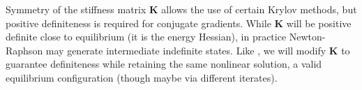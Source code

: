 Symmetry of the stiffness matrix $\mathbf{K}$ allows the use of certain Krylov
methods, but positive definiteness is required for conjugate gradients. While
$\mathbf{K}$ will be positive definite close to equilibrium (it is the energy
Hessian), in practice Newton-Raphson may generate intermediate
indefinite states. Like \cite{teran:2005:quasistatics}, we will modify
$\mathbf{K}$ to guarantee definiteness while retaining the same nonlinear
solution, a valid equilibrium configuration (though maybe via different iterates).



